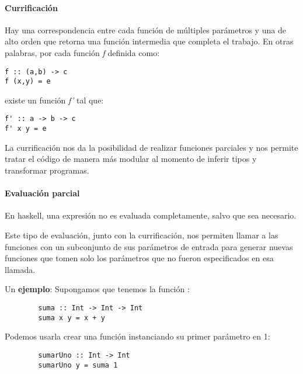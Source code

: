 \paragraph{Currificación} Hay una correspondencia entre cada función de múltiples parámetros y una de alto orden que retorna una función intermedia que completa el trabajo. En otras palabras, por cada función \textit{f} definida como:
\begin{centrado}
	\begin{verbatim}
f :: (a,b) -> c
f (x,y) = e
	\end{verbatim}
\end{centrado} 
existe un función \textit{f'} tal que:
\begin{centrado}
	\begin{verbatim}
f' :: a -> b -> c 
f' x y = e
	\end{verbatim}
\end{centrado} 

La currificación nos da la posibilidad de realizar funciones parciales y nos permite tratar el código de manera más modular al momento de inferir tipos y transformar programas.

\paragraph{Evaluación parcial} En haskell, una expresión no es evaluada completamente, salvo que sea necesario.

Este tipo de evaluación, junto con la currificación, nos permiten llamar a las funciones con un subconjunto de sus parámetros de entrada para generar nuevas funciones que tomen solo los parámetros que no fueron especificados en esa llamada.

Un \textbf{ejemplo}: Supongamos que tenemos la función :

\begin{centrado}
	\begin{verbatim}
		suma :: Int -> Int -> Int
		suma x y = x + y
	\end{verbatim}
\end{centrado} 

Podemos usarla crear una función  instanciando su primer parámetro en 1:

\begin{centrado}
	\begin{verbatim}
		sumarUno :: Int -> Int
		sumarUno y = suma 1
	\end{verbatim}
\end{centrado} 


